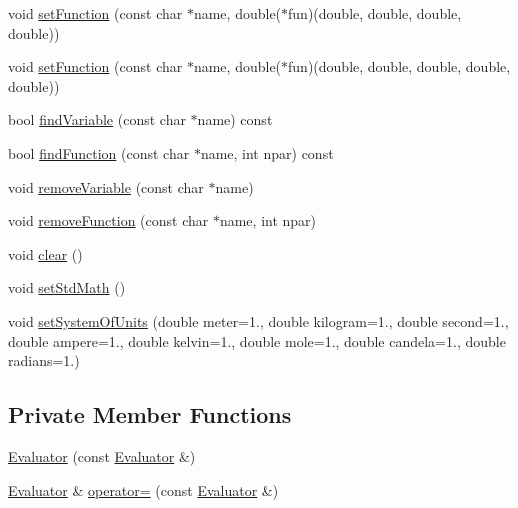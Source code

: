 \begin{DoxyCompactItemize}
\item 
void \hyperlink{class_xml_tools_1_1_evaluator_a7e77831c7bca5fd7bb81d31b657844d1}{set\+Function} (const char $\ast$name, double($\ast$fun)(double, double, double, double))
\item 
void \hyperlink{class_xml_tools_1_1_evaluator_ad4808f32cfac966a6ee400acaf7ff3ca}{set\+Function} (const char $\ast$name, double($\ast$fun)(double, double, double, double, double))
\item 
bool \hyperlink{class_xml_tools_1_1_evaluator_a06ef17e645fba30537c84a15c525b4da}{find\+Variable} (const char $\ast$name) const
\item 
bool \hyperlink{class_xml_tools_1_1_evaluator_a3c5918021a6c6954469d660738704f7e}{find\+Function} (const char $\ast$name, int npar) const
\item 
void \hyperlink{class_xml_tools_1_1_evaluator_a1fbc17d2bdbda88525e309098ba52563}{remove\+Variable} (const char $\ast$name)
\item 
void \hyperlink{class_xml_tools_1_1_evaluator_ac9c3b846be94d03ab2c06c68b4a86448}{remove\+Function} (const char $\ast$name, int npar)
\item 
void \hyperlink{class_xml_tools_1_1_evaluator_ab54a35f068996b3c402c575f3aea242f}{clear} ()
\item 
void \hyperlink{class_xml_tools_1_1_evaluator_a5df1e3d20d6e6d9150378544d95e86b6}{set\+Std\+Math} ()
\item 
void \hyperlink{class_xml_tools_1_1_evaluator_a94fce6a14158fd1e9af0135268f0f68b}{set\+System\+Of\+Units} (double meter=1., double kilogram=1., double second=1., double ampere=1., double kelvin=1., double mole=1., double candela=1., double radians=1.)
\end{DoxyCompactItemize}
\subsection*{Private Member Functions}
\begin{DoxyCompactItemize}
\item 
\hyperlink{class_xml_tools_1_1_evaluator_a3b212d7fe6e68a9f398daebc2968ebfe}{Evaluator} (const \hyperlink{class_xml_tools_1_1_evaluator}{Evaluator} \&)
\item 
\hyperlink{class_xml_tools_1_1_evaluator}{Evaluator} \& \hyperlink{class_xml_tools_1_1_evaluator_a78e101bcb596a10ca44871fd3250b0ca}{operator=} (const \hyperlink{class_xml_tools_1_1_evaluator}{Evaluator} \&)
\end{DoxyCompactItemize}
